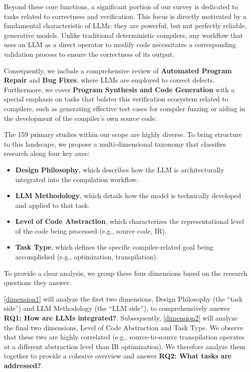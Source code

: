 \documentclass[pdflatex,sn-mathphys-ay,twocolumn, a4paper]{sn-jnl}%
\theoremstyle{thmstyleone}%
\theoremstyle{thmstyletwo}%
\theoremstyle{thmstylethree}%
\begin{document}
Beyond these core functions, a significant portion of our survey is dedicated to tasks related to correctness and verification. This focus is directly motivated by a fundamental characteristic of LLMs: they are powerful, but not perfectly reliable, generative models. Unlike traditional deterministic compilers, any workflow that uses an LLM as a direct operator to modify code necessitates a corresponding validation process to ensure the correctness of its output. 

Consequently, we include a comprehensive review of \textbf{Automated Program Repair} and \textbf{Bug Fixes}, where LLMs are employed to correct defects. Furthermore, we cover \textbf{Program Synthesis and Code Generation} with a special emphasis on tasks that bolster this verification ecosystem related to compilers, such as generating effective test cases for compiler fuzzing or aiding in the development of the compiler's own source code.

The 159 primary studies within our scope are highly diverse. To bring structure to this landscape, we propose a multi-dimensional taxonomy that classifies research along four key axes:

\begin{itemize}
\item \textbf{Design Philosophy}, which describes how the LLM is architecturally integrated into the compilation workflow.
\item \textbf{LLM Methodology}, which details how the model is technically developed and applied to that task.
\item \textbf{Level of Code Abstraction}, which characterizes the representational level of the code being processed (e.g., source code, IR).
\item \textbf{Task Type}, which defines the specific compiler-related goal being accomplished (e.g., optimization, transpilation).
\end{itemize}


To provide a clear analysis, we group these four dimensions based on the research questions they answer.

\autoref{dimension1} will analyze the first two dimensions, Design Philosophy (the ``task side'') and LLM Methodology (the ``LLM side''), to comprehensively answer \textbf{RQ1: How are LLMs integrated?}.
Subsequently, \autoref{dimension2} will analyze the final two dimensions, Level of Code Abstraction and Task Type. 
We observe that these two are highly correlated (e.g., source-to-source transpilation operates at a different abstraction level than IR optimization). We therefore analyze them together to provide a cohesive overview and answer \textbf{RQ2: What tasks are addressed?}.
\end{document}
